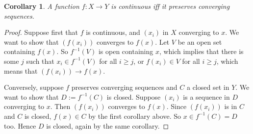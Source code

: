 \documentclass[12pt]{article}
\newtheorem{cor}{Corollary}
\begin{document}
\begin{cor} A function $f:X\to Y$ is continuous iff it preserves converging sequences. \end{cor}
\begin{proof}  Suppose first that $f$ is continuous, and $(x_i)$ in $X$ converging to $x$.  We want to show that $(f(x_i))$ converges to $f(x)$.  Let $V$ be an open set containing $f(x)$.  So $f^{-1}(V)$ is open containing $x$, which implies that there is some $j$ such that $x_i\in f^{-1}(V)$ for all $i\ge j$, or $f(x_i)\in V$ for all $i\ge j$, which means that $(f(x_i))\to f(x)$.

Conversely, suppose $f$ preserves converging sequences and $C$ a closed set in $Y$.  We want to show that $D:=f^{-1}(C)$ is closed.  Suppose $(x_i)$ is a sequence in $D$ converging to $x$.  Then $(f(x_i))$ converges to $f(x)$.  Since $(f(x_i))$ is in $C$ and $C$ is closed, $f(x)\in C$ by the first corollary above.  So $x\in f^{-1}(C)=D$ too.  Hence $D$ is closed, again by the same corollary.
\end{proof}
\end{document}
